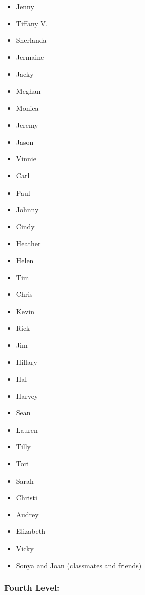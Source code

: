 \begin{multicols}{2}
	\begin{itemize}[leftmargin=1.0cm]
		\item Jenny
		\item Tiffany V.
		\item Sherlanda
		\item Jermaine
		\item Jacky
		\item Meghan
		\item Monica
		\item Jeremy
		\item Jason
		\item Vinnie
		\item Carl
		\item Paul
		\item Johnny
		\item Cindy
		\item Heather
		\item Helen
		\item Tim
		\item Chris
		\item Kevin
		\item Rick
		\item Jim
		\item Hillary
		\item Hal
		\item Harvey
		\item Sean
		\item Lauren
		\item Tilly
		\item Tori
		\item Sarah
		\item Christi
		\item Audrey
		\item Elizabeth
		\item Vicky
		\item Sonya and Joan \break(classmates and friends)
	\end{itemize}
\end{multicols}
\pagebreak  \subsubsection*{Fourth Level:}
